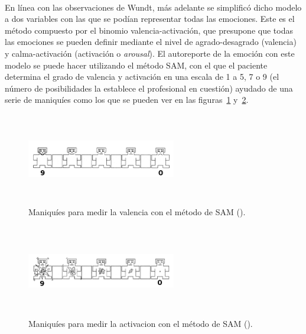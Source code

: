 \paragraph{}
En línea con las observaciones de Wundt, más adelante se simplificó dicho modelo a dos variables con las que se podían representar todas las emociones. Este es el método compuesto por el binomio valencia-activación, que presupone que todas las emociones se pueden definir mediante el nivel de agrado-desagrado (valencia) y calma-activación (activación o \textit{arousal}). El autoreporte de la emoción con este modelo se puede hacer utilizando el método \ac{SAM}, con el que el paciente determina el grado de valencia y activación en una escala de 1 a 5, 7 o 9 (el número de posibilidades la establece el profesional en cuestión) ayudado de una serie de maniquíes como los que se pueden ver en las figuras~\ref{fig:valencia-num} y~\ref{fig:activacion-num}.

\begin{figure}[h]
    \centering
    \includegraphics[width=6.5cm, height=4cm]{Imagenes/valencia-num}
    \caption[Maniquíes para medir la valencia con el método de SAM extraídos del texto de Hernández (\citeyear{hernandez2016clasificacion}).]{Maniquíes para medir la valencia con el método de SAM (\citep{hernandez2016clasificacion}).}
    \label{fig:valencia-num}
\end{figure}

\begin{figure}[h]
    \centering
    \includegraphics[width=6.5cm, height=4cm]{Imagenes/activacion-num}
    \caption[Maniquíes para medir la activación con el método de SAM extraídos del texto de Hernández (\citeyear{hernandez2016clasificacion}).]{Maniquíes para medir la activacion con el método de SAM (\citep{hernandez2016clasificacion}).}
    \label{fig:activacion-num}
\end{figure}

